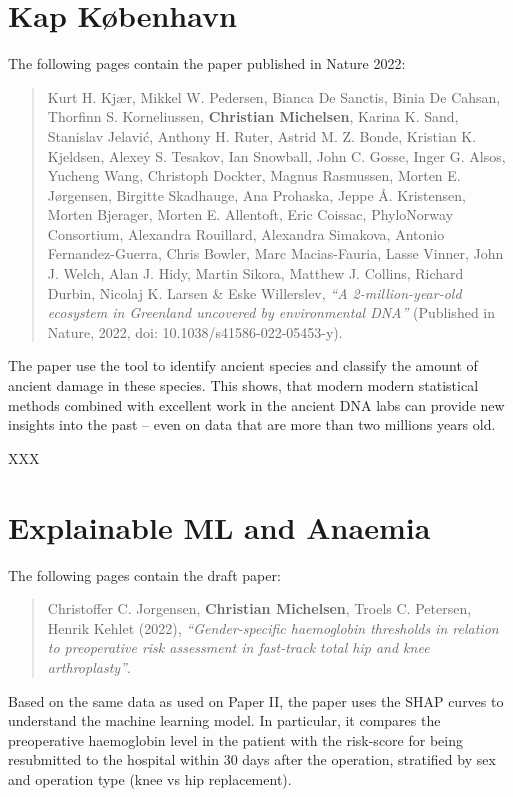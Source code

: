 
\chapter{Kap København}
\label{appendix:kapk}

The following pages contain the paper published in Nature 2022:

\begin{quote}
    Kurt H. Kjær, Mikkel W. Pedersen, Bianca De Sanctis, Binia De Cahsan, Thorfinn S. Korneliussen, \textbf{Christian Michelsen}, Karina K. Sand, Stanislav Jelavić, Anthony H. Ruter, Astrid M. Z. Bonde, Kristian K. Kjeldsen, Alexey S. Tesakov, Ian Snowball, John C. Gosse, Inger G. Alsos, Yucheng Wang, Christoph Dockter, Magnus Rasmussen, Morten E. Jørgensen, Birgitte Skadhauge, Ana Prohaska, Jeppe Å. Kristensen, Morten Bjerager, Morten E. Allentoft, Eric Coissac, PhyloNorway Consortium, Alexandra Rouillard, Alexandra Simakova, Antonio Fernandez-Guerra, Chris Bowler, Marc Macias-Fauria, Lasse Vinner, John J. Welch, Alan J. Hidy, Martin Sikora, Matthew J. Collins, Richard Durbin, Nicolaj K. Larsen \& Eske Willerslev, \emph{``A 2-million-year-old ecosystem in Greenland uncovered by environmental DNA''} (Published in Nature, 2022, doi: 10.1038/s41586-022-05453-y).
\end{quote}
The paper use the \metaDMG tool to identify ancient species and classify the amount of ancient damage in these species.  This shows, that modern modern statistical methods combined with excellent work in the ancient DNA labs can provide new insights into the past -- even on data that are more than two millions years old.

\clearpage
% 
XXX



\chapter{Explainable ML and Anaemia}
\label{appendix:anaemia}

The following pages contain the draft paper:

\begin{quote}
    Christoffer C. Jorgensen, \textbf{Christian Michelsen}, Troels C. Petersen, Henrik Kehlet (2022), \emph{``Gender-specific haemoglobin thresholds in relation to preoperative risk assessment in fast-track total hip and knee arthroplasty''}.
\end{quote}
Based on the same data as used on Paper II, the paper uses the SHAP curves to understand the machine learning model. In particular, it compares the preoperative haemoglobin level in the patient with the risk-score for being resubmitted to the hospital within 30 days after the operation, stratified by sex and operation type (knee vs hip replacement).
\clearpage



